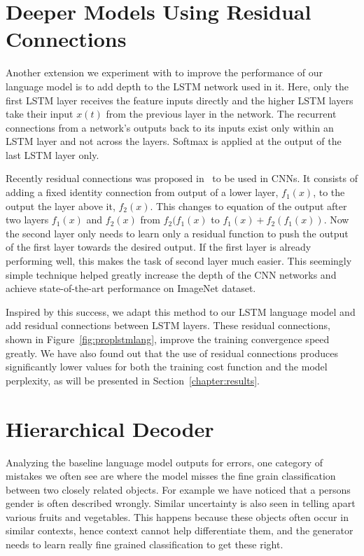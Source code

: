 \section{Deeper Models Using Residual Connections }
Another extension we experiment with to improve the performance of our language
model is to add depth to the LSTM network used in it.
Here, only the first LSTM layer receives the feature inputs directly and the
higher LSTM layers take their input $x(t)$ from the previous layer in the
network.
The recurrent connections from a network's outputs back to its inputs exist only
within an LSTM layer and not across the layers.
Softmax is applied at the output of the last LSTM layer only.

Recently residual connections was proposed in~\cite{He2015} to be used in CNNs.
It consists of adding a fixed identity connection from output of a lower layer,
$f_1(x)$, to the output the layer above it, $f_2(x)$.
This changes to equation of the output after two layers $f_1(x)$ and $f_2(x)$
from $f_2(f_1(x)$ to $f_1(x)+f_2(f_1(x))$.
Now the second layer only needs to learn only a residual function to push the
output of the first layer towards the desired output.
If the first layer is already performing well, this makes the task of second
layer much easier.
This seemingly simple technique helped greatly increase the depth of the CNN
networks and achieve state-of-the-art performance on ImageNet dataset.

Inspired by this success, we adapt this method to our LSTM language model and
add residual connections between LSTM layers. 
These residual connections, shown in Figure~\ref{fig:proplstmlang}, improve the
training convergence speed greatly.
We have also found out that the use of residual connections produces
significantly lower values for both the training cost function and the model
perplexity, as will be presented in Section~\ref{chapter:results}.

\section{Hierarchical Decoder}
\label{sec:ClassFact}
Analyzing the baseline language model outputs for errors, one category of
mistakes we often see are where the model misses the fine grain
classification between two closely related objects.
For example we have noticed that a persons gender is often described wrongly.
Similar uncertainty is also seen in telling apart various fruits and vegetables.
This happens because these objects often occur in similar contexts, hence
context cannot help differentiate them, and the generator needs to learn really
fine grained classification to get these right.

